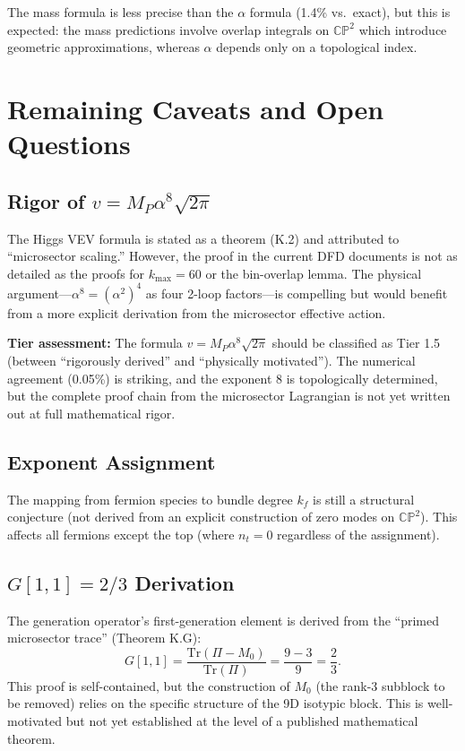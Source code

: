 \documentclass[11pt,a4paper]{article}
\newcommand{\CP}{\mathbb{CP}}
\newcommand{\Tr}{\mathrm{Tr}}
\theoremstyle{definition}
\theoremstyle{remark}
\begin{document}
The mass formula is less precise than the $\alpha$ formula (1.4\% vs.\ exact),
but this is expected: the mass predictions involve overlap integrals on
$\CP^2$ which introduce geometric approximations, whereas $\alpha$
depends only on a topological index.

\section{Remaining Caveats and Open Questions}
\label{sec:caveats}

\subsection{Rigor of $v = M_P\alpha^8\sqrt{2\pi}$}

The Higgs VEV formula is stated as a theorem (K.2) and attributed to
``microsector scaling.'' However, the proof in the current DFD documents
is not as detailed as the proofs for $k_{\max} = 60$ or the bin-overlap
lemma. The physical argument---$\alpha^8 = (\alpha^2)^4$ as four 2-loop
factors---is compelling but would benefit from a more explicit derivation
from the microsector effective action.

\textbf{Tier assessment:} The formula $v = M_P\alpha^8\sqrt{2\pi}$ should
be classified as Tier 1.5 (between ``rigorously derived'' and ``physically
motivated''). The numerical agreement (0.05\%) is striking, and the exponent
8 is topologically determined, but the complete proof chain from the
microsector Lagrangian is not yet written out at full mathematical rigor.

\subsection{Exponent Assignment}

The mapping from fermion species to bundle degree $k_f$ is still a
structural conjecture (not derived from an explicit construction of
zero modes on $\CP^2$). This affects all fermions except the top
(where $n_t = 0$ regardless of the assignment).

\subsection{$G[1,1] = 2/3$ Derivation}

The generation operator's first-generation element is derived from the
``primed microsector trace'' (Theorem K.G):
\[
G[1,1] = \frac{\Tr(\Pi - M_0)}{\Tr(\Pi)} = \frac{9-3}{9} = \frac{2}{3}.
\]
This proof is self-contained, but the construction of $M_0$ (the rank-3
subblock to be removed) relies on the specific structure of the 9D
isotypic block. This is well-motivated but not yet established at the
level of a published mathematical theorem.
\end{document}

